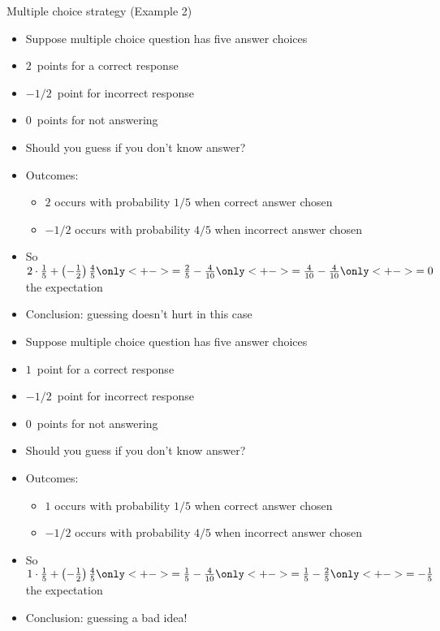 \documentclass[handout]{beamer}
\theoremstyle{definition}
\begin{document}
\begin{frame}{Multiple choice strategy (Example 2)}
\begin{itemize}
\item Suppose multiple choice question has five answer choices
\item $2$~points for a correct response
\item $-1/2$~point for incorrect response
\item $0$~points for not answering
\item Should you guess if you don't know answer?
\item Outcomes:
\begin{itemize}
\item $2$ occurs with probability $1/5$ when correct answer chosen
\item $-1/2$ occurs with probability $4/5$ when incorrect answer chosen
\end{itemize}
\item So $2\cdot\frac{1}{5}+\left(-\frac{1}{2}\right)\frac{4}{5}
\only<+->{=\frac{2}{5}-\frac{4}{10}}
\only<+->{=\frac{4}{10}-\frac{4}{10}}
\only<+->{=0}$ the expectation
\item Conclusion: guessing doesn't hurt \alert{in this case}
\end{itemize}
\end{frame}

\begin{frame}
\begin{itemize}
\item Suppose multiple choice question has five answer choices
\item \alert{$1$~point} for a correct response
\item $-1/2$~point for incorrect response
\item $0$~points for not answering
\item Should you guess if you don't know answer?
\item Outcomes:
\begin{itemize}
\item $1$ occurs with probability $1/5$ when correct answer chosen
\item $-1/2$ occurs with probability $4/5$ when incorrect answer chosen
\end{itemize}
\item So $1\cdot\frac{1}{5}+\left(-\frac{1}{2}\right)\frac{4}{5}
\only<+->{=\frac{1}{5}-\frac{4}{10}}
\only<+->{=\frac{1}{5}-\frac{2}{5}}
\only<+->{=-\frac{1}{5}}$ the expectation
\item Conclusion: guessing a bad idea!
\end{itemize}
\end{frame}
\end{document}
